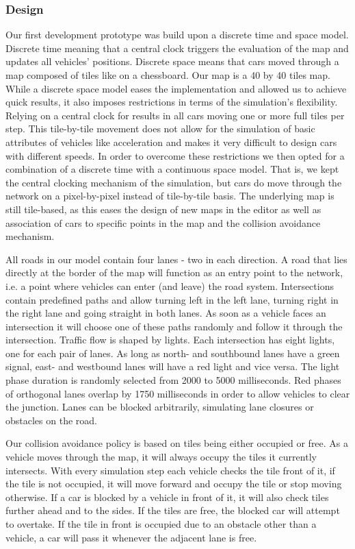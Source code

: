 \subsubsection{Design}
Our first development prototype was build upon a discrete time and space model. Discrete time meaning that a central clock triggers the evaluation of the map and updates all vehicles' positions. Discrete space means that cars moved through a map composed of tiles like on a chessboard. Our map is a  40 by 40 tiles map. While a discrete space model eases the implementation and allowed us to achieve quick results, it also imposes restrictions in terms of the simulation's flexibility. Relying on a central clock for results in all cars moving one or more full tiles per step. This tile-by-tile movement does not allow for the simulation of basic attributes of vehicles like acceleration and makes it very difficult to design cars with different speeds. In order to overcome these restrictions we then opted for a combination of a discrete time  with a continuous space model. That is, we kept the central clocking mechanism of the simulation, but cars do move through the network on a pixel-by-pixel instead of tile-by-tile basis. The underlying map is still tile-based, as this eases the design of new maps in the editor as well as association of cars to specific points in the map and the collision avoidance mechanism.

All roads in our model contain four lanes - two in each direction. A road that lies directly at the border of the map will function as an entry point to the network, i.e. a point where vehicles can enter (and leave) the road system. Intersections contain predefined paths and allow turning left in the left lane, turning right in the right lane and going straight in both lanes. As soon as a vehicle faces an intersection it will choose one of these paths randomly and follow it through the intersection. Traffic flow is shaped by lights. Each intersection has eight lights, one for each pair of lanes. As long as north- and southbound lanes have a green signal, east- and westbound lanes will have a red light and vice versa. The light phase duration is randomly selected from 2000 to 5000 milliseconds. Red phases of orthogonal lanes overlap by 1750 milliseconds in order to allow vehicles to clear the junction. Lanes can be blocked arbitrarily, simulating lane closures or obstacles on the road.

Our collision avoidance policy is based on tiles being either occupied or free. As a vehicle moves through the map, it will always occupy the tiles it currently intersects. With every simulation step each vehicle checks the tile front of it, if the tile is not occupied, it will move forward and occupy the tile or stop moving otherwise. If a car is blocked by a vehicle in front of it, it will also check tiles further ahead and to the sides. If the tiles are free, the blocked car will attempt to overtake. If the tile in front is occupied due to an obstacle other than a vehicle, a car will pass it whenever the adjacent lane is free.


